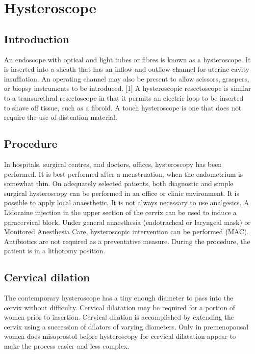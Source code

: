 \documentclass[12pt]{article}
\begin{document}
\clearpage

\section{Hysteroscope}

\subsection{Introduction}

An endoscope with optical and light tubes or fibres is known as a hysteroscope. It is inserted into a sheath that has an inflow and outflow channel for uterine cavity insufflation. An operating channel may also be present to allow scissors, graspers, or biopsy instruments to be introduced. [1] A hysteroscopic resectoscope is similar to a transurethral resectoscope in that it permits an electric loop to be inserted to shave off tissue, such as a fibroid.  A touch hysteroscope is one that does not require the use of distention material.

\subsection{Procedure}

In hospitals, surgical centres, and doctors, offices, hysteroscopy has been performed. It is best performed after a menstruation, when the endometrium is somewhat thin. On adequately selected patients, both diagnostic and simple surgical hysteroscopy can be performed in an office or clinic environment. It is possible to apply local anaesthetic. It is not always necessary to use analgesics. A Lidocaine injection in the upper section of the cervix can be used to induce a paracervical block. Under general anaesthesia (endotracheal or laryngeal mask) or Monitored Anesthesia Care, hysteroscopic intervention can be performed (MAC). Antibiotics are not required as a preventative measure. During the procedure, the patient is in a lithotomy position.


\subsection{Cervical dilation}

The contemporary hysteroscope has a tiny enough diameter to pass into the cervix without difficulty. Cervical dilatation may be required for a portion of women prior to insertion. Cervical dilation is accomplished by extending the cervix using a succession of dilators of varying diameters. Only in premenopausal women does misoprostol before hysteroscopy for cervical dilatation appear to make the process easier and less complex.
\end{document}
